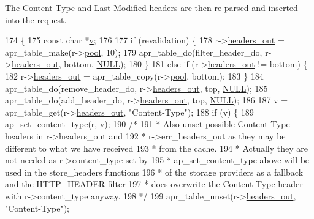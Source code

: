 The Content-\/\+Type and Last-\/\+Modified headers are then re-\/parsed and inserted into the request. 
\begin{DoxyCode}
174 \{
175     \textcolor{keyword}{const} \textcolor{keywordtype}{char} *\hyperlink{pcregrep_8txt_ac2002bf2124e804678bf3ccba93693c5}{v};
176 
177     \textcolor{keywordflow}{if} (revalidation) \{
178         r->\hyperlink{structrequest__rec_a0fd560d8d1118304dc33df8ee99efc04}{headers\_out} = apr\_table\_make(r->\hyperlink{structrequest__rec_aa0a0c16f9a9ab3901cdb3f3c9c9d83d0}{pool}, 10);
179         apr\_table\_do(filter\_header\_do, r->\hyperlink{structrequest__rec_a0fd560d8d1118304dc33df8ee99efc04}{headers\_out}, bottom, \hyperlink{pcre_8txt_ad7f989d16aa8ca809a36bc392c07fba1}{NULL});
180     \}
181     \textcolor{keywordflow}{else} \textcolor{keywordflow}{if} (r->\hyperlink{structrequest__rec_a0fd560d8d1118304dc33df8ee99efc04}{headers\_out} != bottom) \{
182         r->\hyperlink{structrequest__rec_a0fd560d8d1118304dc33df8ee99efc04}{headers\_out} = apr\_table\_copy(r->\hyperlink{structrequest__rec_aa0a0c16f9a9ab3901cdb3f3c9c9d83d0}{pool}, bottom);
183     \}
184     apr\_table\_do(remove\_header\_do, r->\hyperlink{structrequest__rec_a0fd560d8d1118304dc33df8ee99efc04}{headers\_out}, top, \hyperlink{pcre_8txt_ad7f989d16aa8ca809a36bc392c07fba1}{NULL});
185     apr\_table\_do(add\_header\_do, r->\hyperlink{structrequest__rec_a0fd560d8d1118304dc33df8ee99efc04}{headers\_out}, top, \hyperlink{pcre_8txt_ad7f989d16aa8ca809a36bc392c07fba1}{NULL});
186 
187     v = apr\_table\_get(r->\hyperlink{structrequest__rec_a0fd560d8d1118304dc33df8ee99efc04}{headers\_out}, \textcolor{stringliteral}{"Content-Type"});
188     \textcolor{keywordflow}{if} (v) \{
189         ap\_set\_content\_type(r, v);
190         \textcolor{comment}{/*}
191 \textcolor{comment}{         * Also unset possible Content-Type headers in r->headers\_out and}
192 \textcolor{comment}{         * r->err\_headers\_out as they may be different to what we have received}
193 \textcolor{comment}{         * from the cache.}
194 \textcolor{comment}{         * Actually they are not needed as r->content\_type set by}
195 \textcolor{comment}{         * ap\_set\_content\_type above will be used in the store\_headers functions}
196 \textcolor{comment}{         * of the storage providers as a fallback and the HTTP\_HEADER filter}
197 \textcolor{comment}{         * does overwrite the Content-Type header with r->content\_type anyway.}
198 \textcolor{comment}{         */}
199         apr\_table\_unset(r->\hyperlink{structrequest__rec_a0fd560d8d1118304dc33df8ee99efc04}{headers\_out}, \textcolor{stringliteral}{"Content-Type"});

\end{DoxyCode}

